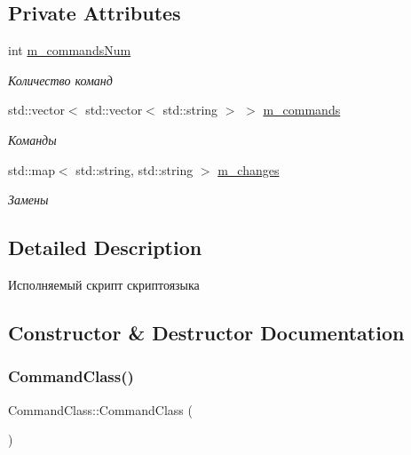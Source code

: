 \subsection*{Private Attributes}
\begin{DoxyCompactItemize}
\item 
int \hyperlink{class_command_class_a1f3d88378858d9ca0d301b811e27c595}{m\+\_\+commands\+Num}
\begin{DoxyCompactList}\small\item\em Количество команд \end{DoxyCompactList}\item 
std\+::vector$<$ std\+::vector$<$ std\+::string $>$ $>$ \hyperlink{class_command_class_a62f495584385f25ae53ebad1964324fd}{m\+\_\+commands}
\begin{DoxyCompactList}\small\item\em Команды \end{DoxyCompactList}\item 
std\+::map$<$ std\+::string, std\+::string $>$ \hyperlink{class_command_class_af174f90e955a7ebe88fa66033a830961}{m\+\_\+changes}
\begin{DoxyCompactList}\small\item\em Замены \end{DoxyCompactList}\end{DoxyCompactItemize}


\subsection{Detailed Description}
Исполняемый скрипт скриптоязыка 

\subsection{Constructor \& Destructor Documentation}
\mbox{\label{class_command_class_af2cda2eecc2e6728cc695765f3f55cb1}} 
\subsubsection{\texorpdfstring{Command\+Class()}{CommandClass()}\hspace{0.1cm}{\footnotesize\ttfamily [1/2]}}
{\footnotesize\ttfamily Command\+Class\+::\+Command\+Class (\begin{DoxyParamCaption}{ }\end{DoxyParamCaption})}

